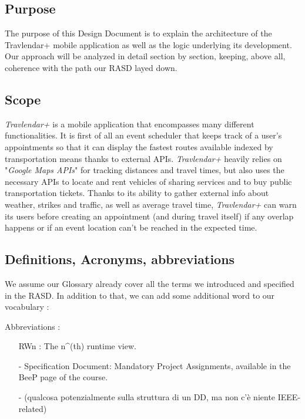 \subsection{Purpose}
The purpose of this Design Document is to explain the architecture of the Travlendar+ mobile application as well as the logic underlying its development. Our approach will be analyzed in detail section by section, keeping, above all, coherence with the path our RASD layed down.

\subsection{Scope}
\textit{Travlendar+} is a mobile application that encompasses many different functionalities. 
It is first of all an event scheduler that keeps track of a user’s appointments so that it can display the fastest routes available indexed by transportation means thanks to external APIs.
\textit{Travlendar+} heavily relies on "\textit{Google Maps APIs}" for tracking distances and travel times, but also uses the necessary APIs to locate and rent vehicles of sharing services and to buy public transportation tickets. Thanks to its ability to gather external info about weather, strikes and traffic, as well as average travel time, \textit{Travlendar+} can warn its users before creating an appointment (and during travel itself) if any overlap happens or if an event location can’t be reached in the expected time.

\subsection{Definitions, Acronyms, abbreviations}
We assume our Glossary already cover all the terms we introduced and specified in the RASD. In addition to that, we can add some additional word to our vocabulary :

Abbreviations :
\begin{itemize}
	\item [RWn] : The n^(th) runtime view.
\end{itemize}

\begin{itemize}
		\item[-] \textsf{Specification Document: Mandatory Project Assignments}, available in the BeeP page of the course.
		\item[-] (qualcosa potenzialmente sulla struttura di un DD, ma non c’è niente IEEE-related)
\end{itemize} 

